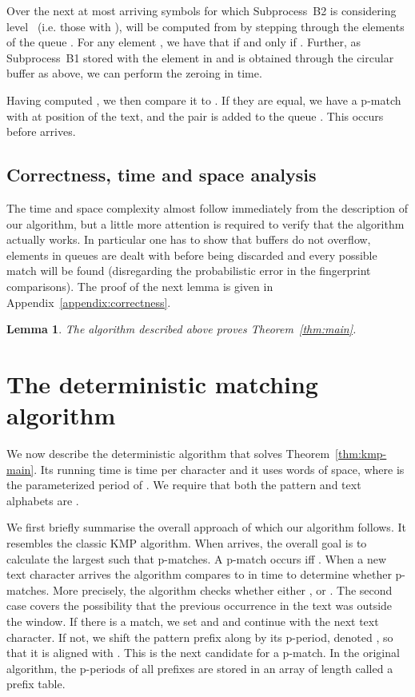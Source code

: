\documentclass[11pt,a4paper]{article}
\theoremstyle{theorem}
\newtheorem{lemma}[theorem]{Lemma}
\newcommand{\pmatch}{\mbox{p-match}\xspace}
\newcommand{\pmatches}{\mbox{p-matches}\xspace}
\newcommand{\pperiod}{\mbox{p-period}\xspace}
\newcommand{\procBdelta}{\textup{B1}\xspace}
\newcommand{\procBphi}{\textup{B2}\xspace}
\begin{document}
Over the next at most  arriving symbols for which Subprocess~\procBphi is considering level~ (i.e. those with ),
 will be computed from
  by stepping through the elements of the queue . For any element , we have that  if and only if .
Further, as Subprocess~\procBdelta stored  with the element in  and  is obtained through the circular buffer as above, we can perform the zeroing in  time.

 Having computed , we then compare it to . If they are equal, we have a \pmatch with  at position  of the text, and the pair  is added to the queue . This occurs before  arrives.



\subsection{Correctness, time and space analysis}

The time and space complexity almost follow immediately from the description of our algorithm, but a little more attention is required to verify that the algorithm actually works. In particular one has to show that buffers do not overflow, elements in queues are dealt with before being discarded and every possible match will be found (disregarding the probabilistic error in the fingerprint comparisons). The proof of the next lemma is given in Appendix~\ref{appendix:correctness}.

\begin{lemma}
    \label{lem:correctness}
    The algorithm described above proves Theorem~\ref{thm:main}.
\end{lemma}









\section{The deterministic matching algorithm}\label{sec:smallrho}

We now describe the deterministic algorithm that solves Theorem~\ref{thm:kmp-main}. Its running time is  time per character and it uses  words of space, where  is the parameterized period
of . We require that both the pattern and text alphabets are .


We first briefly summarise the overall approach of \cite{AFM:1994} which our algorithm follows. It resembles the classic KMP algorithm. When  arrives, the overall goal is to calculate the largest  such that  \pmatches .
A \pmatch occurs iff .
When a new text character  arrives the algorithm compares
 to  in  time to determine whether  \pmatches .
    More precisely, the algorithm checks whether either , or . The second case covers the possibility that the previous occurrence in the text was outside the window.
If there is a match, we set  and  and continue with the next text character. If not, we shift the pattern prefix  along by its \pperiod, denoted , so that it is aligned with . This is the next candidate for a \pmatch. In the original algorithm, the p-periods of all prefixes are stored in an array of length  called a prefix table.
\end{document}
